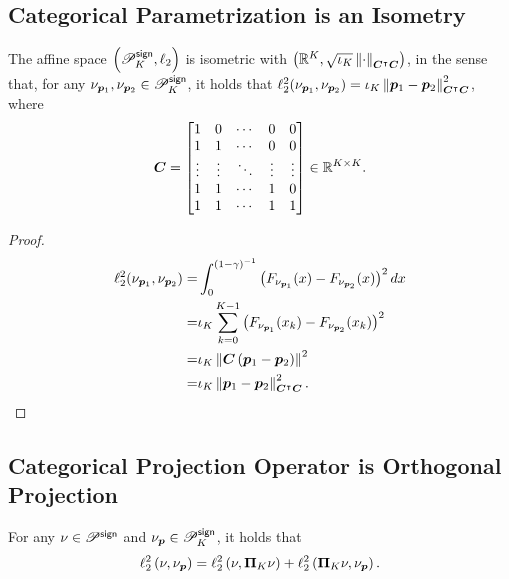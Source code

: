 \subsection{Categorical Parametrization is an Isometry}\label{appendix:PK_isometric}
\begin{proposition}\label{prop:PK_isometric}
The affine space $\left({{\mathscr{P}}^{\mathsf{sign}}_K, \ell_2}\right)$ is isometric with $\left({{\mathbb R}^{K}, \sqrt{\iota_K}\left\|{\cdot}\right\|_{{\bm{C}}^\intercal {\bm{C}}}}\right)$, in the sense that, for any $\nu_{{\bm{p}}_1},\nu_{{\bm{p}}_2}\in{\mathscr{P}}^{\mathsf{sign}}_K$, it holds that $\ell_2^2(\nu_{{\bm{p}}_1},\nu_{{\bm{p}}_2})=\iota_K\left\|{{\bm{p}}_1-{\bm{p}}_2}\right\|^2_{{\bm{C}}^{\intercal}{\bm{C}}}$, where
\begin{equation}\label{eq:def_C}
    {\bm{C}} = 
\begin{bmatrix}
1 & 0 & \cdots & 0 & 0 \\
1 & 1 & \cdots & 0 & 0 \\
\vdots & \vdots & \ddots & \vdots & \vdots \\
1 & 1 & \cdots & 1 & 0 \\
1 & 1 & \cdots & 1 & 1
\end{bmatrix}\in{\mathbb R}^{K\times K}.
\end{equation}
\end{proposition}
\begin{proof}
\begin{equation*}
    \begin{aligned}
    \ell_2^2(\nu_{{\bm{p}}_1},\nu_{{\bm{p}}_2})=&\int_{0}^{\left({1{-}\gamma}\right)^{-1}}\left({F_{\nu_{{\bm{p}}_1}}(x)-F_{\nu_{{\bm{p}}_2}}(x)}\right)^2 d x\\
    =&\iota_K\sum_{k=0}^{K-1}\left({F_{\nu_{{\bm{p}}_1}}(x_k)-F_{\nu_{{\bm{p}}_2}}(x_k)}\right)^2\\
    =&\iota_K\left\|{{\bm{C}}\left({{\bm{p}}_{1}-{\bm{p}}_{2}}\right)}\right\|^2\\
    =&\iota_K\left\|{{\bm{p}}_{1}-{\bm{p}}_{2}}\right\|^2_{{\bm{C}}^{\intercal}{\bm{C}}}.
\end{aligned}
\end{equation*}
\end{proof}

\subsection{Categorical Projection Operator is Orthogonal Projection}\label{appendix:cate_project_orth}
\begin{proposition} \cite[Lemma~9.17]{bdr2022} \label{prop:orthogonal_decomposition}
For any $\nu\in{\mathscr{P}}^{\mathsf{sign}}$ and $\nu_{{\bm{p}}}\in{\mathscr{P}}^{\mathsf{sign}}_K$, it holds that
\begin{equation*}
    \ell_2^2\left({\nu,\nu_{\bm{p}}}\right)=\ell_2^2\left({\nu,\bm{\Pi}_K\nu}\right)+\ell_2^2\left({\bm{\Pi}_K\nu,\nu_{\bm{p}}}\right).
\end{equation*}
\end{proposition}

